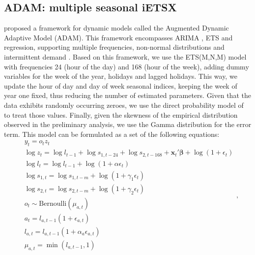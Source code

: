 \documentclass[]{elsarticle} %
\begin{document}
\hypertarget{adam-multiple-seasonal-ietsx}{%
\subsection{ADAM: multiple seasonal iETSX}\label{adam-multiple-seasonal-ietsx}}

\citet{SvetunkovAdam2021} proposed a framework for dynamic models called the Augmented Dynamic Adaptive Model (ADAM). This framework encompasses ARIMA \citep{Box1976}, ETS \citep{Hyndman2008b} and regression, supporting multiple frequencies, non-normal distributions and intermittent demand \citep{Svetunkov2019a}. Based on this framework, we use the ETS(M,N,M) model with frequencies 24 (hour of the day) and 168 (hour of the week), adding dummy variables for the week of the year, holidays and lagged holidays. This way, we update the hour of day and day of week seasonal indices, keeping the week of year one fixed, thus reducing the number of estimated parameters. Given that the data exhibits randomly occurring zeroes, we use the direct probability model of \citet{Svetunkov2019a} to treat those values. Finally, given the skewness of the empirical distribution observed in the preliminary analysis, we use the Gamma distribution for the error term. This model can be formulated as a set of the following equations:
\begin{equation}
    \begin{aligned}
      & y_t = o_t z_t \\
        & \log z_t = \log l_{t-1} + \log s_{1,t-24} + \log s_{2,t-168} + \mathbf{x}_t' \boldsymbol{\beta} + \log \left(1 + \epsilon_{t} \right) \\
        & \log l_{t} = \log l_{t-1} + \log( 1  + \alpha \epsilon_{t}) \\ 
        & \log s_{1,t} = \log s_{1,t-m} + \log( 1  + \gamma_1 \epsilon_{t}) \\
        & \log s_{2,t} = \log s_{2,t-m} + \log( 1  + \gamma_2 \epsilon_{t}) \\
        & o_t \sim \text{Bernoulli} \left(\mu_{a,t} \right) \\
        & a_t = l_{a,t-1} \left(1 + \epsilon_{a,t} \right) \\
        & l_{a,t} = l_{a,t-1}( 1  + \alpha_{a} \epsilon_{a,t}) \\
        & \mu_{a,t} = \min(l_{a,t-1}, 1)
    \end{aligned} ,
    \label{eq:ADAMModel}
\end{equation}
\end{document}
